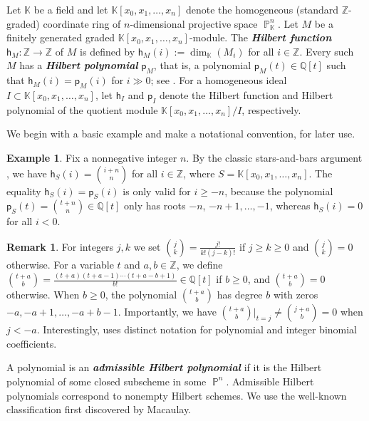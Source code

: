 \documentclass[12pt]{amsart}%
\theoremstyle{definition}%
\newtheorem{example}[theorem]{Example}
\newtheorem{remark}[theorem]{Remark}
\DeclareMathOperator{\PP}{\mathbb{P}}%
\newcommand{\hf}{\mathsf{h}}%
\newcommand{\hp}{\mathsf{p}}%
\newcommand{\kk}{\mathbb{K}}%
\newcommand{\QQ}{\mathbb{Q}}%
\newcommand{\ZZ}{\mathbb{Z}}%
\begin{document}
Let $\kk$ be a field and let $\kk[x_0, x_1, \dotsc ,x_n]$ denote the
homogeneous (standard $\ZZ$-graded) coordinate ring of $n$-dimensional
projective space $\PP^n_{\kk}$.  Let $M$ be a finitely generated
graded $\kk[x_0, x_1, \dotsc, x_n]$\nobreakdash-module.  The
\emph{\bfseries Hilbert function} $\hf_M \colon \ZZ \to \ZZ$ of $M$ is
defined by $\hf_M(i) := \dim_{\kk} (M_i)$ for all $i \in \ZZ$.  Every
such $M$ has a \emph{\bfseries Hilbert polynomial} $\hp_M$, that is, a
polynomial $\hp_M(t) \in \QQ[t]$ such that $\hf_M(i) = \hp_M(i)$ for
$i \gg 0$; see \cite[Theorem~4.1.3]{Bruns--Herzog--1993}.  For a
homogeneous ideal $I \subset \kk[x_0, x_1, \dotsc, x_n]$, let $\hf_I$
and $\hp_I$ denote the Hilbert function and Hilbert polynomial of the
quotient module $\kk[x_0, x_1, \dotsc, x_n]/I$, respectively.

We begin with a basic example and make a notational convention, for
later use.

\begin{example}%
  \label{eg:myfirstpoly} 
  Fix a nonnegative integer $n$.  By the classic stars-and-bars
  argument \cite[Section~1.2]{Stanley--2012}, we have $\hf_{S}(i) =
  \binom{i + n}{n}$ for all $i \in \ZZ$, where $S = \kk[x_0, x_1,
    \dotsc, x_n]$.  The equality $\hf_{S}(i) = \hp_{S}(i)$ is only
  valid for $i \ge -n$, because the polynomial $\hp_{S}(t) = \binom{t
    + n}{n} \in \QQ[t]$ only has roots $-n$, $-n+1, \dotsc, -1$,
  whereas $\hf_{S}(i) = 0$ for all $i < 0$.
\end{example}

\begin{remark}%
  \label{rmk:binconv}
  For integers $j,k$ we set $\binom{j}{k} = \frac{j!}{k!(j-k)!}$ if $j
  \ge k \ge 0$ and $\binom{j}{k} = 0$ otherwise.  For a variable $t$
  and $a, b \in \ZZ$, we define $\binom{t + a}{b} = \frac{(t + a)(t +
    a - 1) \dotsb (t + a - b + 1)}{b!} \in \QQ[t]$ if $b \ge 0$, and
  $\binom{t + a}{b} = 0$ otherwise.  When $b \ge 0$, the polynomial
  $\binom{t + a}{b}$ has degree $b$ with zeros $-a, -a+1, \dotsc,
  -a+b-1$.  Importantly, we have $\binom{t + a}{b} \rvert_{t = j} \ne
  \binom{j + a}{b} = 0$ when $j < -a$.  Interestingly,
  \cite[p.533]{Macaulay--1927} uses distinct notation for polynomial
  and integer binomial coefficients.
\end{remark}

A polynomial is an \emph{\bfseries admissible Hilbert polynomial} if
it is the Hilbert polynomial of some closed subscheme in some $\PP^n$.
Admissible Hilbert polynomials correspond to nonempty Hilbert schemes.
We use the well-known classification first discovered by Macaulay.
\end{document}
